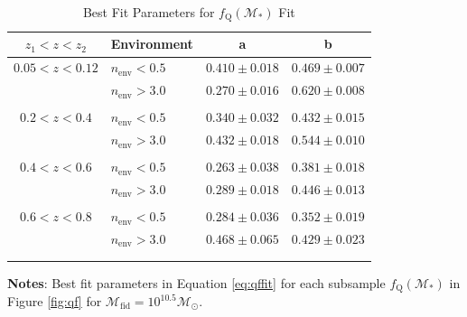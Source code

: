 \documentclass{emulateapj}
\def \lowenvthresh {0.5}
\def \highenvthresh {3.0}
\begin{document}
\begin{table} 
  \caption{Best Fit Parameters for $f_{\mathrm{Q}}(\mathcal{M}_{*})$ Fit}
  \label{tab:bestfitparam}
  \begin{center}
    \leavevmode
    \begin{tabular}{clcc} \hline \hline              
    $z_1 < z < z_2$ &Environment        &a  &b  \\ \hline 
$0.05 < z< 0.12$ &$n_{\mathrm{env}} < \lowenvthresh$ & $0.410 \pm 0.018$ & $0.469 \pm 0.007$ \\
               &$n_{\mathrm{env}} > \highenvthresh$ & $0.270 \pm 0.016$ & $0.620 \pm 0.008$ \\ 
                              &               &                       &                           \\ \hline   
$0.2 < z <0.4$ & $n_{\mathrm{env}} < \lowenvthresh$ & $0.340 \pm 0.032$ & $0.432 \pm 0.015$ \\
               &$n_{\mathrm{env}} > \highenvthresh$ & $0.432 \pm 0.018$ & $0.544 \pm 0.010$ \\
               &               &                       &                           \\ \hline
$0.4 < z < 0.6$      &$n_{\mathrm{env}} < \lowenvthresh$ & $0.263 \pm 0.038$ & $0.381 \pm 0.018$ \\
               &$n_{\mathrm{env}} > \highenvthresh$ & $0.289 \pm 0.018$ & $0.446 \pm 0.013$ \\
               &               &                       &                           \\ \hline
$0.6 < z < 0.8$      &$n_{\mathrm{env}} < \lowenvthresh$ & $0.284 \pm 0.036$ & $0.352 \pm 0.019$ \\
               &$n_{\mathrm{env}} > \highenvthresh$            & $0.468 \pm 0.065$ & $0.429 \pm 0.023$ \\
               &               &                       &                           \\ \hline
  \multicolumn{4}{l}{}                                             \\       
    \end{tabular} \par
    \end{center}
    {\bf Notes}: Best fit parameters in Equation \ref{eq:qffit} for each subsample $f_{\mathrm{Q}}(\mathcal{M}_{*})$ in Figure \ref{fig:qf} for $\mathcal{M}_{\mathrm{fid}} = 10^{10.5} \mathcal{M}_{\odot}$.
\end{table}
\end{document}
